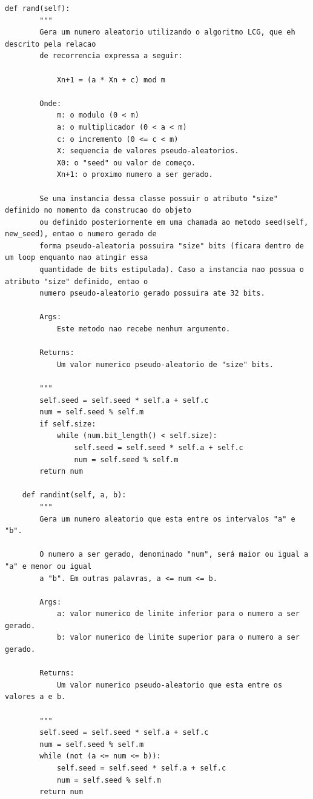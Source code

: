 \documentclass[a4paper,11pt]{article}
\theoremstyle{mytheor}
\begin{document}
\begin{lstlisting}[caption=Arquivo lcg.py.]
    def rand(self):
        """
        Gera um numero aleatorio utilizando o algoritmo LCG, que eh descrito pela relacao
        de recorrencia expressa a seguir:

            Xn+1 = (a * Xn + c) mod m

        Onde: 
            m: o modulo (0 < m)
            a: o multiplicador (0 < a < m)
            c: o incremento (0 <= c < m)
            X: sequencia de valores pseudo-aleatorios.
            X0: o "seed" ou valor de começo.
            Xn+1: o proximo numero a ser gerado.

        Se uma instancia dessa classe possuir o atributo "size" definido no momento da construcao do objeto
        ou definido posteriormente em uma chamada ao metodo seed(self, new_seed), entao o numero gerado de 
        forma pseudo-aleatoria possuira "size" bits (ficara dentro de um loop enquanto nao atingir essa 
        quantidade de bits estipulada). Caso a instancia nao possua o atributo "size" definido, entao o
        numero pseudo-aleatorio gerado possuira ate 32 bits.

        Args:
            Este metodo nao recebe nenhum argumento.

        Returns:
            Um valor numerico pseudo-aleatorio de "size" bits.

        """
        self.seed = self.seed * self.a + self.c
        num = self.seed % self.m
        if self.size:
            while (num.bit_length() < self.size):
                self.seed = self.seed * self.a + self.c
                num = self.seed % self.m
        return num

    def randint(self, a, b):
        """
        Gera um numero aleatorio que esta entre os intervalos "a" e "b". 

        O numero a ser gerado, denominado "num", será maior ou igual a "a" e menor ou igual
        a "b". Em outras palavras, a <= num <= b.

        Args:
            a: valor numerico de limite inferior para o numero a ser gerado.
            b: valor numerico de limite superior para o numero a ser gerado.

        Returns:
            Um valor numerico pseudo-aleatorio que esta entre os valores a e b.

        """
        self.seed = self.seed * self.a + self.c
        num = self.seed % self.m
        while (not (a <= num <= b)):
            self.seed = self.seed * self.a + self.c
            num = self.seed % self.m
        return num


\end{lstlisting}
\end{document}
